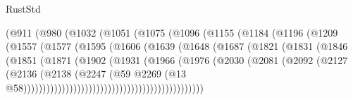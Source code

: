\begin{lexlean}{RustStd}
\begin{coremodule}
                            (@911
                              (@980
                                (@1032
                                  (@1051
                                    (@1075
                                      (@1096
                                        (@1155
                                          (@1184
                                            (@1196
                                              (@1209
                                                (@1557
                                                  (@1577
                                                    (@1595
                                                      (@1606
                                                        (@1639
                                                          (@1648
                                                            (@1687
                                                              (@1821
                                                                (@1831
                                                                  (@1846
                                                                    (@1851
                                                                      (@1871
                                                                        (@1902
                                                                          (@1931
                                                                            (@1966
                                                                              (@1976
                                                                                (@2030
                                                                                  (@2081
                                                                                    (@2092
                                                                                      (@2127
                                                                                        (@2136
                                                                                          (@2138
                                                                                            (@2247
                                                                                              (@59
                                                                                                @2269
                                                                                                (@13
                                                                                                  @58)))))))))))))))))))))))))))))))))))))))))))))))

\end{coremodule}
\end{lexlean}
